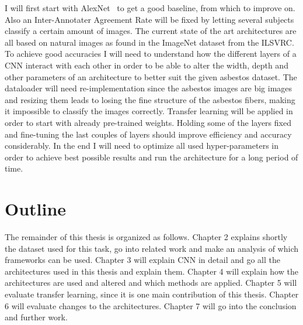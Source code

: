 I will first start with AlexNet~\cite{krizhevsky2012imagenet} to get a good baseline, from which to improve on. Also an Inter-Annotater Agreement Rate will be fixed by letting several subjects classify a certain amount of images. The current state of the art architectures are all based on natural images as found in the ImageNet dataset from the ILSVRC. To achieve good accuracies I will need to understand how the different layers of a CNN interact with each other in order to be able to alter the width, depth and other parameters of an architecture to better suit the given asbestos dataset. The dataloader will need re-implementation since the asbestos images are big images and resizing them leads to losing the fine structure of the asbestos fibers, making it impossible to classify the images correctly. Transfer learning will be applied in order to start with already pre-trained weights. Holding some of the layers fixed and fine-tuning the last couples of layers should improve efficiency and accuracy considerably. In the end I will need to optimize all used hyper-parameters in order to achieve best possible results and run the architecture for a long period of time.

\section{Outline}

The remainder of this thesis is organized as follows. Chapter 2 explains shortly the dataset used for this task, go into related work and make an analysis of which frameworks can be used. Chapter 3 will explain CNN in detail and go  all the architectures used in this thesis and explain them. Chapter 4 will explain how the architectures are used and altered and which methods are applied. Chapter 5 will evaluate transfer learning, since it is one main contribution of this thesis. Chapter 6 will evaluate changes to the architectures. Chapter 7 will go into the conclusion and further work.
